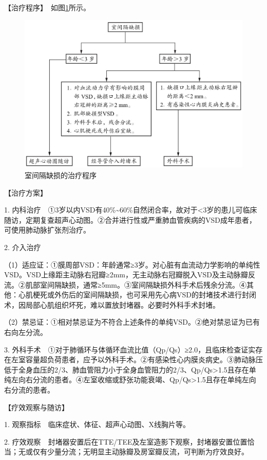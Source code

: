 【治疗程序】　如图\ref{fig2-9-2}所示。

\begin{figure}[!htbp]
 \centering
 \includegraphics{./images/Image00078.jpg}
 \captionsetup{justification=centering}
 \caption{室间隔缺损的治疗程序}
 \label{fig2-9-2}
  \end{figure} 

【治疗方案】

1.
内科治疗　①3岁以内VSD有40\%\textasciitilde{}60\%自然闭合率，故对于\textless{}3岁的患儿可临床随访，定期复查超声心动图。②合并进行性或严重肺血管疾病的VSD成年患者，可使用肺动脉扩张剂治疗。

2. 介入治疗

（1）适应证：①膜周部VSD：年龄通常≥3岁。对心脏有血流动力学影响的单纯性VSD。VSD上缘距主动脉右冠瓣≥2mm，无主动脉右冠瓣脱入VSD及主动脉瓣反流。②肌部室间隔缺损，通常≥5mm。③室间隔缺损外科手术后残余分流。④其他：心肌梗死或外伤后的室间隔缺损，也可采用先心病VSD的封堵技术进行封闭术，因局部心肌组织坏死，难以置放封堵器。必要时外科手术封堵。

（2）禁忌证：①相对禁忌证为不符合上述条件的单纯VSD。②绝对禁忌证为已有右向左分流。

3.
外科手术　①对于肺循环与体循环血流比值（Qp/Qs）≥2.0，且临床检查证实存在左室容量超负荷患者，应予以外科手术。②有感染性心内膜炎病史。③肺动脉压低于全身血压的2/3、肺血管阻力小于全身血管阻力的2/3、Qp/Qs\textgreater{}1.5且存在单纯左向右分流的患者。④左室收缩或舒张功能衰竭、Qp/Qs\textgreater{}1.5且存在单纯左向右分流的患者。

【疗效观察与随访】

1. 观察指标　临床症状、体征、超声心动图、X线胸片等。

2.
疗效观察　封堵器安置后在TTE/TEE及左室造影下观察，封堵器安置位置恰当；无或仅有少量分流；无明显主动脉瓣及房室瓣反流，可判断为疗效良好。

